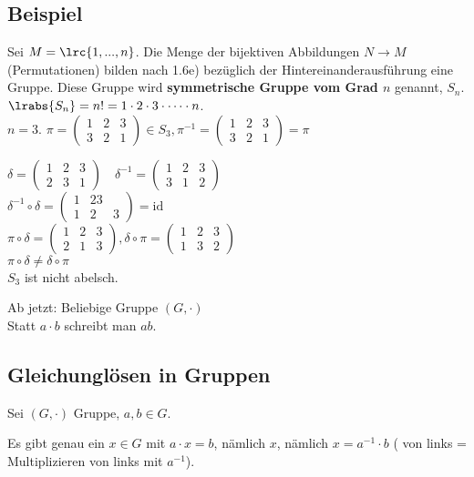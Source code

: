 	\subsection{Beispiel}
	
	Sei $M=\lrc{1,...,n}$. Die Menge der bijektiven Abbildungen $N\rightarrow M$ (Permutationen) bilden nach 1.6e) bezüglich der Hintereinanderausführung eine Gruppe. Diese Gruppe wird \textbf{symmetrische Gruppe vom Grad $n$} genannt, $S_n$.\\
	$\lrabs{S_n}=n!=1\cdot 2\cdot 3\cdot\dots\cdot n$.\\
	$n=3$. $\pi=\begin{pmatrix}1&2&3\\3&2&1\end{pmatrix}\in S_3,\pi^{-1}=\begin{pmatrix}1&2&3\\3&2&1\end{pmatrix}=\pi$
	
	$\delta=\begin{pmatrix}1&2&3\\2&3&1\end{pmatrix}
	\quad\delta^{-1}=
	\begin{pmatrix}1&2&3\\3&1&2\end{pmatrix}$\\
	$\delta^{-1}\circ\delta=
	\begin{pmatrix}1&23\\1&2&3\end{pmatrix}=\mbox{id}$\\
	$\pi\circ\delta=\begin{pmatrix}1&2&3\\2&1&3\end{pmatrix},\delta\circ\pi=\begin{pmatrix}1&2&3\\1&3&2\end{pmatrix}$\\
	$\pi\circ\delta\neq\delta\circ\pi$\\
	$S_3$ ist nicht abelsch.
	
	Ab jetzt: Beliebige Gruppe $(G,\cdot)$\\
	Statt $a\cdot b$ schreibt man $ab$.
	
	\subsection{Gleichunglösen in Gruppen}
	
	Sei $(G,\cdot)$ Gruppe, $a,b\in G$.
		\item Es gibt genau ein $x\in G$ mit $a\cdot x=b$, nämlich $x$, nämlich $x=a^{-1}\cdot b$ ( von links = Multiplizieren von links mit $a^{-1}$).
		
